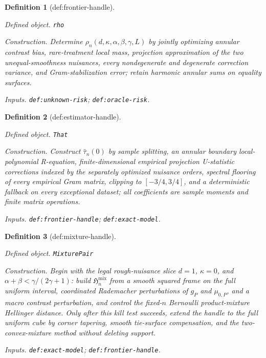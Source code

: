 \documentclass{article}
\newtheorem{definition}{Definition}
\begin{document}
\begin{definition}[def:frontier-handle]\label{def:frontier-handle}
\par\smallskip\noindent\emph{Defined object.} \texttt{rho}
\par\smallskip\noindent\emph{Construction.} Determine \(\rho_n(d,\kappa,\alpha,\beta,\gamma,L)\) by jointly optimizing annular contrast bias, rare-treatment local mass, projection approximation of the two unequal-smoothness nuisances, every nondegenerate and degenerate correction variance, and Gram-stabilization error; retain harmonic annular sums on equality surfaces.
\par\smallskip\noindent\emph{Inputs.} \texttt{def:\allowbreak{}unknown-\allowbreak{}risk}; \texttt{def:\allowbreak{}oracle-\allowbreak{}risk}.
\end{definition}

\begin{definition}[def:estimator-handle]\label{def:estimator-handle}
\par\smallskip\noindent\emph{Defined object.} \texttt{That}
\par\smallskip\noindent\emph{Construction.} Construct \(\widehat\tau_n(0)\) by sample splitting, an annular boundary local-polynomial R-equation, finite-dimensional empirical projection U-statistic corrections indexed by the separately optimized nuisance orders, spectral flooring of every empirical Gram matrix, clipping to \([-3/4,3/4]\), and a deterministic fallback on every exceptional dataset; all coefficients are sample moments and finite matrix operations.
\par\smallskip\noindent\emph{Inputs.} \texttt{def:\allowbreak{}frontier-\allowbreak{}handle}; \texttt{def:\allowbreak{}exact-\allowbreak{}model}.
\end{definition}

\begin{definition}[def:mixture-handle]\label{def:mixture-handle}
\par\smallskip\noindent\emph{Defined object.} \texttt{MixturePair}
\par\smallskip\noindent\emph{Construction.} Begin with the legal rough-nuisance slice \(d=1\), \(\kappa=0\), and \(\alpha+\beta<\gamma/(2\gamma+1)\): build \(\mathfrak H_n^{\mathrm{mix}}\) from a smooth squared frame on the full uniform interval, coordinated Rademacher perturbations of \(g_P\) and \(\mu_{0,P}\), and a macro contrast perturbation, and control the fixed-\(n\) Bernoulli product-mixture Hellinger distance. Only after this kill test succeeds, extend the handle to the full uniform cube by corner tapering, smooth tie-surface compensation, and the two-convex-mixture method without deleting support.
\par\smallskip\noindent\emph{Inputs.} \texttt{def:\allowbreak{}exact-\allowbreak{}model}; \texttt{def:\allowbreak{}frontier-\allowbreak{}handle}.
\end{definition}
\end{document}
